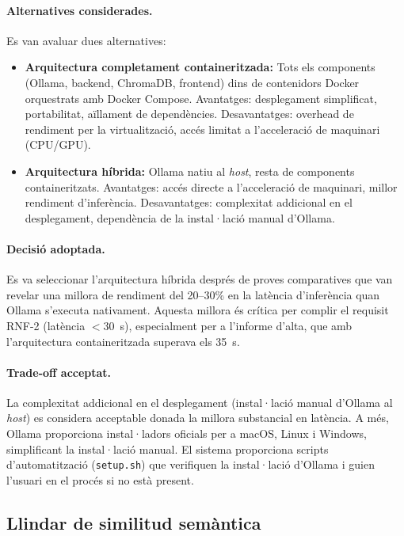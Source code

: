 \documentclass[CAT]{TFUOC}%
\begin{document}
\paragraph{Alternatives considerades.}
Es van avaluar dues alternatives:

\begin{itemize}
    \item \textbf{Arquitectura completament containeritzada:} Tots els components (Ollama, backend, ChromaDB, frontend) dins de contenidors Docker orquestrats amb Docker Compose. Avantatges: desplegament simplificat, portabilitat, aïllament de dependències. Desavantatges: overhead de rendiment per la virtualització, accés limitat a l'acceleració de maquinari (CPU/GPU).
    
    \item \textbf{Arquitectura híbrida:} Ollama natiu al \textit{host}, resta de components containeritzats. Avantatges: accés directe a l'acceleració de maquinari, millor rendiment d'inferència. Desavantatges: complexitat addicional en el desplegament, dependència de la instal·lació manual d'Ollama.
\end{itemize}

\paragraph{Decisió adoptada.}
Es va seleccionar l'arquitectura híbrida després de proves comparatives que van revelar una millora de rendiment del 20--30\% en la latència d'inferència quan Ollama s'executa nativament. Aquesta millora és crítica per complir el requisit RNF-2 (latència $<$30~s), especialment per a l'informe d'alta, que amb l'arquitectura containeritzada superava els 35~s.

\paragraph{Trade-off acceptat.}
La complexitat addicional en el desplegament (instal·lació manual d'Ollama al \textit{host}) es considera acceptable donada la millora substancial en latència. A més, Ollama proporciona instal·ladors oficials per a macOS, Linux i Windows, simplificant la instal·lació manual. El sistema proporciona scripts d'automatització (\texttt{setup.sh}) que verifiquen la instal·lació d'Ollama i guien l'usuari en el procés si no està present.

\subsection{Llindar de similitud semàntica}
\end{document}
